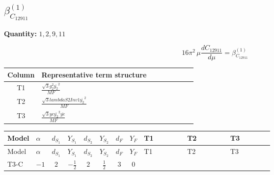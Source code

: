 \documentclass[8pt]{article}
\begin{document}
\begin{landscape}
\section*{$\beta_{C_{12911}}^{(1)}$}
\noindent\textbf{Quantity: }$\mathrm{1,2,9,11}$\par\smallskip
\[16\pi^2\,\mu\frac{d C_{12911}}{d\mu}=\beta_{C_{12911}}^{(1)}\]
\begin{center}
\begin{tabular}{@{}c >{\raggedright\arraybackslash}p{0.82\linewidth}@{}}
\toprule
Column & Representative term structure \\
\midrule
T1 & \(\displaystyle \frac{\sqrt{3} g_{2}^{2} \overline{y_{2}}^{2}}{MF}\) \\
\midrule
T2 & \(\displaystyle \frac{\sqrt{3} lambdaS2Inv1 \overline{y_{2}}^{2}}{MF}\) \\
\midrule
T3 & \(\displaystyle \frac{\sqrt{3} ye \overline{y_{2}}^{2} \overline{ye}}{MF}\) \\
\midrule
\bottomrule
\end{tabular}
\end{center}
\smallskip
\tiny
\begin{longtable}{@{}llcccccc >{\raggedright\arraybackslash}p{0.21\linewidth} >{\raggedright\arraybackslash}p{0.21\linewidth} >{\raggedright\arraybackslash}p{0.21\linewidth}@{}}
\toprule
Model & $\alpha$ & $d_{S_1}$ & $Y_{S_1}$ & $d_{S_2}$ & $Y_{S_2}$ & $d_F$ & $Y_F$ & T1 & T2 & T3 \\
\midrule
\endfirsthead
\toprule
Model & $\alpha$ & $d_{S_1}$ & $Y_{S_1}$ & $d_{S_2}$ & $Y_{S_2}$ & $d_F$ & $Y_F$ & T1 & T2 & T3 \\
\midrule
\endhead
T3-C & $-1$ & $2$ & $-\frac{1}{2}$ & $2$ & $\frac{1}{2}$ & $3$ & $0$ & \scriptsize\adjustbox{max width=\linewidth}{$\begin{gathered} \frac{\sqrt{3} g_{2}^{2} \overline{y_{2}}^{2}}{8 MF}\end{gathered}$} & \scriptsize\adjustbox{max width=\linewidth}{$\begin{gathered} \frac{\sqrt{3} lambdaS2Inv1 \overline{y_{2}}^{2}}{12 MF}\end{gathered}$} & \scriptsize\adjustbox{max width=\linewidth}{$\begin{gathered} - \frac{\sqrt{3} ye \overline{y_{2}}^{2} \overline{ye}}{24 MF}\end{gathered}$} \\
\midrule
\bottomrule
\end{longtable}
\clearpage

\end{landscape}
\end{document}
